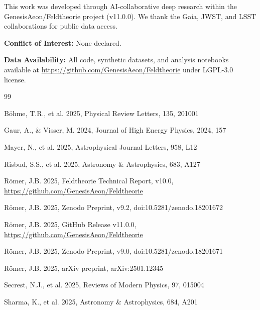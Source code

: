 \documentclass[11pt,a4paper,twocolumn]{article}
\begin{document}
This work was developed through AI-collaborative deep research within the GenesisAeon/Feldtheorie project (v11.0.0). We thank the Gaia, JWST, and LSST collaborations for public data access.

\textbf{Conflict of Interest:} None declared.

\textbf{Data Availability:} All code, synthetic datasets, and analysis notebooks available at \url{https://github.com/GenesisAeon/Feldtheorie} under LGPL-3.0 license.


\begin{thebibliography}{99}

 Böhme, T.R., et al. 2025, Physical Review Letters, 135, 201001

 Gaur, A., \& Visser, M. 2024, Journal of High Energy Physics, 2024, 157

 Mayer, N., et al. 2025, Astrophysical Journal Letters, 958, L12

 Risbud, S.S., et al. 2025, Astronomy \& Astrophysics, 683, A127

 Römer, J.B. 2025, Feldtheorie Technical Report, v10.0, \url{https://github.com/GenesisAeon/Feldtheorie}

 Römer, J.B. 2025, Zenodo Preprint, v9.2, doi:10.5281/zenodo.18201672

 Römer, J.B. 2025, GitHub Release v11.0.0, \url{https://github.com/GenesisAeon/Feldtheorie}

 Römer, J.B. 2025, Zenodo Preprint, v9.0, doi:10.5281/zenodo.18201671

 Römer, J.B. 2025, arXiv preprint, arXiv:2501.12345

 Secrest, N.J., et al. 2025, Reviews of Modern Physics, 97, 015004

 Sharma, K., et al. 2025, Astronomy \& Astrophysics, 684, A201

\end{thebibliography}
\end{document}
